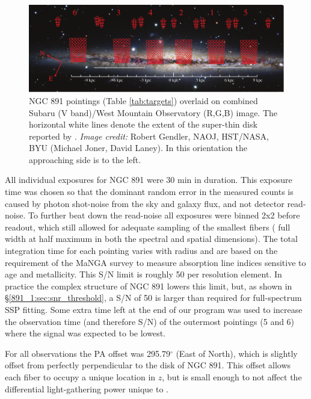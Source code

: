 \begin{figure}
  \centering
  \includegraphics[width=\textwidth]{891_1/figs/NGC_891_better_pointings.pdf}
  \caption{\label{fig:pointings}\fixspacing NGC 891 \GP pointings
    (Table \ref{tab:targets}) overlaid on combined Subaru (V
    band)/West Mountain Observatory (R,G,B) image. The horizontal
    white lines denote the extent of the super-thin disk reported by
    \citet{Schechtman-Rook13}. \emph{Image credit:} Robert Gendler,
    NAOJ, HST/NASA, BYU (Michael Joner, David Laney). In this
    orientation the approaching side is to the left.}
\end{figure}

All individual exposures for NGC 891 were 30 min in duration. This
exposure time was chosen so that the dominant random error in the
measured counts is caused by photon shot-noise from the sky and galaxy
flux, and not detector read-noise. To further beat down the read-noise
all exposures were binned 2x2 before readout, which still allowed for
adequate sampling of the smallest fibers ( full
width at half maximum in both the spectral and spatial
dimensions). The total integration time for each pointing varies with
radius and are based on the requirement of the MaNGA survey
\citep{Bundy15} to measure absorption line indices sensitive to age
and metallicity. This S/N limit is roughly 50 per resolution
element. In practice the complex structure of NGC 891 lowers this
limit, but, as shown in \S\ref{891_1:sec:snr_threshold}, a S/N of 50 is
larger than required for full-spectrum SSP fitting. Some extra time
left at the end of our program was used to increase the observation
time (and therefore S/N) of the outermost pointings (5 and 6) where
the signal was expected to be lowest.

For all \GP observations the PA offset was 295.79$^{\circ}$ (East of
North), which is slightly offset from perfectly perpendicular to the
disk of NGC 891. This offset allows each fiber to occupy a unique
location in $z$, but is small enough to not affect the differential
light-gathering power unique to \GP.

